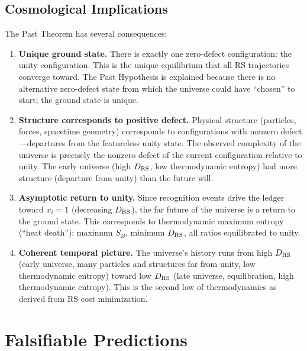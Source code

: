 \documentclass[12pt,a4paper]{article}
\theoremstyle{definition}
\theoremstyle{remark}
\begin{document}
\subsection{Cosmological Implications}

The Past Theorem has several consequences:
\begin{enumerate}
  \item \textbf{Unique ground state.}  There is exactly one
  zero-defect configuration: the unity configuration.  This is the
  unique equilibrium that all RS trajectories converge toward.  The Past
  Hypothesis is explained because there is no alternative zero-defect
  state from which the universe could have ``chosen'' to start; the
  ground state is unique.

  \item \textbf{Structure corresponds to positive defect.}  Physical
  structure (particles, forces, spacetime geometry) corresponds to
  configurations with nonzero defect---departures from the featureless
  unity state.  The observed complexity of the universe is precisely the
  nonzero defect of the current configuration relative to unity.  The
  early universe (high $D_{\rm RS}$, low thermodynamic entropy) had
  more structure (departure from unity) than the future will.

  \item \textbf{Asymptotic return to unity.}  Since recognition events
  drive the ledger toward $x_i = 1$ (decreasing $D_{\rm RS}$), the far
  future of the universe is a return to the ground state.  This
  corresponds to thermodynamic maximum entropy (``heat death''): maximum
  $S_B$, minimum $D_{\rm RS}$, all ratios equilibrated to unity.

  \item \textbf{Coherent temporal picture.}  The universe's history
  runs from high $D_{\rm RS}$ (early universe, many particles and
  structures far from unity, low thermodynamic entropy) toward low
  $D_{\rm RS}$ (late universe, equilibration, high thermodynamic
  entropy).  This is the second law of thermodynamics as derived from
  RS cost minimization.
\end{enumerate}

\section{Falsifiable Predictions}
\label{sec:falsify}
\end{document}
